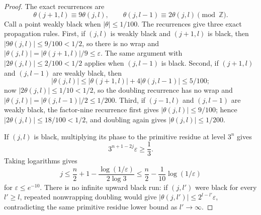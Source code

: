 \begin{proof}
The exact recurrences are
\[
 \theta(j+1,l)\equiv9\theta(j,l),\qquad
 \theta(j,l-1)\equiv2\theta(j,l)\pmod{\mathbb Z}.
\]
Call a point weakly black when \(|\theta|\le1/100\).  The recurrences give
three exact propagation rules.  First, if \((j,l)\) is weakly black and
\((j+1,l)\) is black, then \(|9\theta(j,l)|\le9/100<1/2\), so there is no
wrap and \(|\theta(j,l)|=|\theta(j+1,l)|/9\le\varepsilon\).  The same
argument with \(|2\theta(j,l)|\le2/100<1/2\) applies when \((j,l-1)\) is
black.  Second, if \((j+1,l)\) and \((j,l-1)\) are weakly black, then
\[
 |\theta(j,l)|\le |\theta(j+1,l)|+4|\theta(j,l-1)|\le5/100;
\]
now \(|2\theta(j,l)|\le1/10<1/2\), so the doubling recurrence has no wrap
and \(|\theta(j,l)|=|\theta(j,l-1)|/2\le1/200\).  Third, if
\((j-1,l)\) and \((j,l-1)\) are weakly black, the factor-nine recurrence
first gives \(|\theta(j,l)|\le9/100\); hence
\(|2\theta(j,l)|\le18/100<1/2\), and doubling again gives
\(|\theta(j,l)|\le1/200\).

If \((j,l)\) is black, multiplying its phase to the primitive residue at
level \(3^n\) gives
\[
 3^{n+1-2j}\varepsilon\ge\frac13.
\]
Taking logarithms gives
\[
 j\le \frac n2+1-\frac{\log(1/\varepsilon)}{2\log3}
 \le \frac n2-\frac1{10}\log(1/\varepsilon)
\]
for \(\varepsilon\le e^{-10}\).  There is no infinite upward black run:
if \((j,l')\) were black for every \(l'\ge l\), repeated nonwrapping
doubling would give
\(|\theta(j,l')|\le2^{l-l'}\varepsilon\), contradicting the same primitive
residue lower bound as \(l'\to\infty\).


\end{proof}

